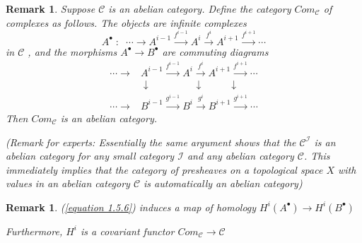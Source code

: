 \documentclass{article}
\newtheorem{remark}[theorem]{Remark}
\begin{document}
\begin{remark}
    Suppose $\mathscr C$ is an abelian category. Define the category $Com_\mathscr C$ of complexes as follows. The objects are infinite complexes
    \begin{equation}
    A^\bullet\; :
    \;\;
    \cdots \rightarrow A^{i-1} \xrightarrow{f^{i-1}}
    A^{i}
    \xrightarrow{f^{i}}
    A^{i+1}
    \xrightarrow{f^{i+1}}
    \cdots
    \end{equation}
    in $\mathscr C$ , and the morphisms $A^\bullet \rightarrow B^\bullet$ are commuting diagrams
    \begin{equation}
    \begin{split}    
    \cdots \rightarrow &A^{i-1} \xrightarrow{f^{i-1}}
    A^{i}
    \xrightarrow{f^{i}}
    A^{i+1}
    \xrightarrow{f^{i+1}}
    \cdots
    \\
    &\downarrow     \quad\quad\quad\quad\;
    \downarrow 
    \quad\quad\enspace
    \downarrow
    \\
    \cdots \rightarrow &B^{i-1} \xrightarrow{g^{i-1}}
    B^{i}
    \xrightarrow{g^{i}}
    B^{i+1}
    \xrightarrow{g^{i+1}}
    \cdots        
    \end{split}
    \label{equation 1.5.6}
    \end{equation}        
    Then $Com_\mathscr C$ is an abelian category.
    
     (Remark for experts: Essentially the same argument shows that the $\mathscr C^\mathscr I$ is an abelian category for any small category $\mathscr I$ and any abelian category $\mathscr C$. This immediately implies that the category of presheaves on a topological space $X$ with values in an abelian category $\mathscr C$ is automatically an abelian category)
\end{remark}
\begin{remark}
    (\ref{equation 1.5.6}) induces a map of homology $H^i(A^\bullet) \rightarrow H^i(B^\bullet)$
    
    Furthermore, $H^i$ is a covariant functor $Com_\mathscr C \rightarrow \mathscr C$
\end{remark}
\end{document}

